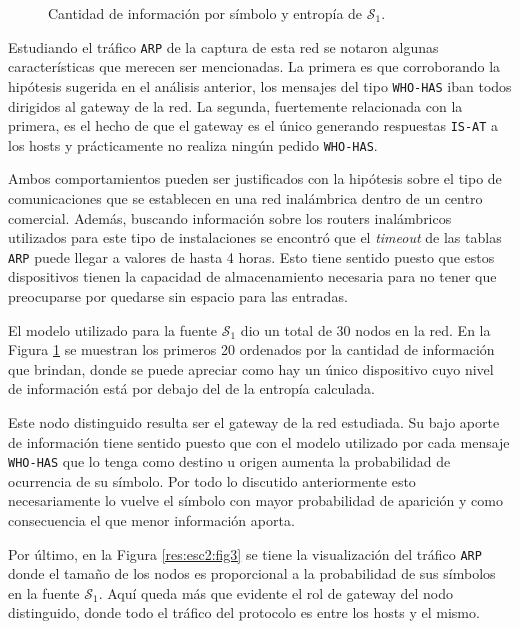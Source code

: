 \begin{figure}[h]
	\caption{Cantidad de información por símbolo y entropía de $\mathcal{S}_1$.}
    \label{res:esc2:fig2}
\end{figure}

Estudiando el tráfico \texttt{ARP} de la captura de esta red se notaron algunas
características que merecen ser mencionadas. La primera es que corroborando la
hipótesis sugerida en el análisis anterior, los mensajes del tipo
\texttt{WHO-HAS} iban todos dirigidos al gateway de la red. La segunda,
fuertemente relacionada con la primera, es el hecho de que el gateway es el
único generando respuestas \texttt{IS-AT} a los hosts y prácticamente no realiza
ningún pedido \texttt{WHO-HAS}.

Ambos comportamientos pueden ser justificados con la hipótesis sobre el tipo de
comunicaciones que se establecen en una red inalámbrica dentro de un centro
comercial. Además, buscando información sobre los routers inalámbricos
utilizados para este tipo de instalaciones se encontró que el \emph{timeout} de
las tablas \texttt{ARP} puede llegar a valores de hasta 4 horas. Esto tiene
sentido puesto que estos dispositivos tienen la capacidad de almacenamiento
necesaria para no tener que preocuparse por quedarse sin espacio para las
entradas.

El modelo utilizado para la fuente $\mathcal{S}_1$ dio un total de 30 nodos en la
red. En la Figura \ref{res:esc2:fig2} se muestran los primeros 20 ordenados por
la cantidad de información que brindan, donde se puede apreciar como hay un
único dispositivo cuyo nivel de información está por debajo del de la entropía
calculada.

Este nodo distinguido resulta ser el gateway de la red estudiada. Su bajo aporte
de información tiene sentido puesto que con el modelo utilizado por cada mensaje
\texttt{WHO-HAS} que lo tenga como destino u origen aumenta la probabilidad de
ocurrencia de su símbolo. Por todo lo discutido anteriormente esto
necesariamente lo vuelve el símbolo con mayor probabilidad de aparición y como
consecuencia el que menor información aporta.

Por último, en la Figura \ref{res:esc2:fig3} se tiene la visualización del
tráfico \texttt{ARP} donde el tamaño de los nodos es proporcional a la
probabilidad de sus símbolos en la fuente $\mathcal{S}_1$. Aquí queda más que
evidente el rol de gateway del nodo distinguido, donde todo el tráfico del
protocolo es entre los hosts y el mismo.

